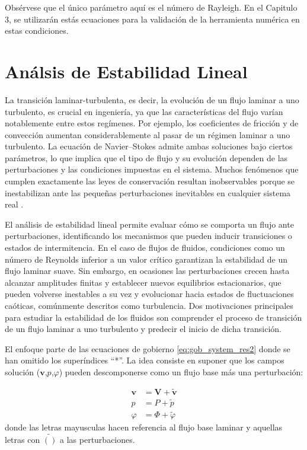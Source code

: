 Obsérvese que el único parámetro aquí es el número de Rayleigh. En el Capitulo 3, se utilizarán estás ecuaciones para la validación de la herramienta numérica en estas condiciones. 

\section{Análsis de Estabilidad Lineal}

La transición laminar-turbulenta, es decir, la evolución de un flujo laminar a uno turbulento, es crucial en ingeniería, ya que las características del flujo varían notablemente entre estos regímenes. Por ejemplo, los coeficientes de fricción y de convección aumentan considerablemente al pasar de un régimen laminar a uno turbulento. La ecuación de Navier–Stokes admite ambas soluciones bajo ciertos parámetros, lo que implica que el tipo de flujo y su evolución dependen de las perturbaciones y las condiciones impuestas en el sistema. Muchos fenómenos que cumplen exactamente las leyes de conservación resultan inobservables porque se inestabilizan ante las pequeñas perturbaciones inevitables en cualquier sistema real \cite{kundu}.

El análisis de estabilidad lineal permite evaluar cómo se comporta un flujo ante perturbaciones, identificando los mecanismos que pueden inducir transiciones o estados de intermitencia. En el caso de flujos de fluidos, condiciones como un número de Reynolds inferior a un valor crítico garantizan la estabilidad de un flujo laminar suave. Sin embargo, en ocasiones las perturbaciones crecen hasta alcanzar amplitudes finitas y establecer nuevos equilibrios estacionarios, que pueden volverse inestables a su vez y evolucionar hacia estados de fluctuaciones caóticas, comúnmente descritos como turbulencia. Dos motivaciones principales para estudiar la estabilidad de los fluidos son comprender el proceso de transición de un flujo laminar a uno turbulento y predecir el inicio de dicha transición.

El enfoque parte de las ecuaciones de gobierno \ref{eq:gob_system_res2} donde se han omitido los superíndices ``*''. La idea consiste en suponer que los campos solución ($\mathbf{v}$,$p$,$\varphi$) pueden descomponerse como un flujo base más una perturbación:

\begin{align}
\mathbf{v} &= \mathbf{V} + \widetilde{\mathbf{v}} \\
p &= P + \widetilde{p} \\
\varphi &= \Phi + \widetilde{\varphi}
\end{align}  
donde las letras mayusculas hacen referencia al flujo base laminar y aquellas letras con $\widetilde{()}$ a las perturbaciones. %

